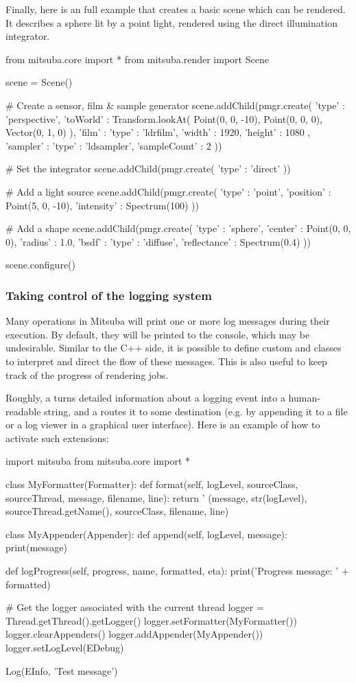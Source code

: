 Finally, here is an full example that creates a basic scene
which can be rendered. It describes a sphere lit by a point 
light, rendered using the direct illumination integrator.
\begin{python}
from mitsuba.core import *
from mitsuba.render import Scene

scene = Scene()

# Create a sensor, film & sample generator
scene.addChild(pmgr.create({
	'type' : 'perspective',
	'toWorld' : Transform.lookAt(
		Point(0, 0, -10),
		Point(0, 0, 0),
		Vector(0, 1, 0)
	),
	'film' : {
		'type' : 'ldrfilm',
		'width' : 1920,
		'height' : 1080
	},
	'sampler' : {
		'type' : 'ldsampler',
		'sampleCount' : 2
	}
}))

# Set the integrator
scene.addChild(pmgr.create({
	'type' : 'direct'
}))

# Add a light source
scene.addChild(pmgr.create({
	'type' : 'point',
	'position' : Point(5, 0, -10),
	'intensity' : Spectrum(100)
}))

# Add a shape
scene.addChild(pmgr.create({
	'type' : 'sphere',
	'center' : Point(0, 0, 0),
	'radius' : 1.0,
	'bsdf' : {
		'type' : 'diffuse',
		'reflectance' : Spectrum(0.4)
	}
}))

scene.configure()
\end{python}

\subsubsection{Taking control of the logging system}
Many operations in Mitsuba will print one or more log messages
during their execution. By default, they will be printed to the console,
which may be undesirable. Similar to the C++ side, it is possible to define
custom  and  classes to interpret and direct
the flow of these messages. This is also useful to keep track of the progress
of rendering jobs.

Roughly, a  turns detailed
information about a logging event into a human-readable string, and a
 routes it to some destination (e.g. by appending it to
a file or a log viewer in a graphical user interface). Here is an example
of how to activate such extensions:
\begin{python}
import mitsuba
from mitsuba.core import *

class MyFormatter(Formatter):
	def format(self, logLevel, sourceClass, sourceThread, message, filename, line):
		return '%
				(message, str(logLevel), sourceThread.getName(), sourceClass, 
				 filename, line)

class MyAppender(Appender):
	def append(self, logLevel, message):
		print(message)

	def logProgress(self, progress, name, formatted, eta):
		print('Progress message: ' + formatted)

# Get the logger associated with the current thread
logger = Thread.getThread().getLogger()
logger.setFormatter(MyFormatter())
logger.clearAppenders()
logger.addAppender(MyAppender())
logger.setLogLevel(EDebug)

Log(EInfo, 'Test message')
\end{python}
